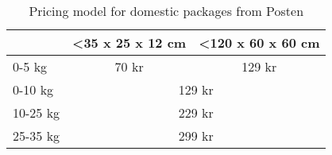 \begin{table}[h]
    \centering
    \caption{Pricing model for domestic packages from Posten}
    \label{pricingmodel}
    \begin{tabular}{|l|cl|}
    \hline
             & \multicolumn{1}{l|}{\textless 35 x 25 x 12 cm} & \textless 120 x 60 x 60 cm  \\ \hline
    0-5 kg   & \multicolumn{1}{c|}{70 kr}                     & \multicolumn{1}{c|}{129 kr} \\ \hline
    0-10 kg  & \multicolumn{2}{c|}{129 kr}                                                  \\ \hline
    10-25 kg & \multicolumn{2}{c|}{229 kr}                                                  \\ \hline
    25-35 kg & \multicolumn{2}{c|}{299 kr}                                                  \\ \hline
    \end{tabular}
\end{table}

